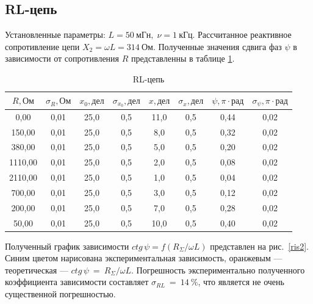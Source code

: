 \documentclass[a4paper, 12pt]{article}
\begin{document}
\subsection{RL-цепь}

Установленные параметры: $L = 50~мГн,\; \nu = 1~кГц$. Рассчитанное реактивное сопротивление цепи $X_2 = \omega L = 314~Ом$. Полученные значения сдвига фаз $\psi$ в зависимости от сопротивления $R$ представленны в таблице \ref{tab2}.

\begin{table}[h!]
\begin{center}
\begin{tabular}{|c|c|c|c|c|c|c|c|}
\hline
$R, Ом$   & $\sigma_R, Ом$ & $x_0, дел$ & $\sigma_{x_0}, дел$ & $x, дел$ & $\sigma_x, дел$ & $\psi, \pi \cdot рад$ & $\sigma_{\psi}, \pi \cdot рад$ \\ \hline
0,00    & 0,01   & 25,0    & 0,5      & 11,0   & 0,5     & 0,44        & 0,02         \\ \hline
150,00  & 0,01   & 25,0    & 0,5      & 8,0    & 0,5     & 0,32        & 0,02         \\ \hline
380,00  & 0,01   & 25,0    & 0,5      & 5,0    & 0,5     & 0,20        & 0,02         \\ \hline
1110,00 & 0,01   & 25,0    & 0,5      & 2,0    & 0,5     & 0,08        & 0,02         \\ \hline
2110,00 & 0,01   & 25,0    & 0,5      & 1,0    & 0,5     & 0,04        & 0,02         \\ \hline
700,00  & 0,01   & 25,0    & 0,5      & 3,0    & 0,5     & 0,12        & 0,02         \\ \hline
200,00  & 0,01   & 25,0    & 0,5      & 7,0    & 0,5     & 0,28        & 0,02         \\ \hline
50,00   & 0,01   & 25,0    & 0,5      & 10,0   & 0,5     & 0,40        & 0,02         \\ \hline
\end{tabular}
\end{center}
\caption{RL-цепь}
\label{tab2}
\end{table}

Полученный график зависимости $ctg\,\psi = f(R_{\Sigma}/\omega L)$ представлен на рис.~\ref{ris2}. Синим цветом нарисована экспериментальная зависимость, оранжевым --- теоретическая --- $ctg\,\psi~=~R_{\Sigma}/\omega L$. Погрешность экспериментально полученного коэффициента зависимости составляет $\sigma_{RL}~=~14~\%$, что является не очень существенной погрешностью.
\end{document}

